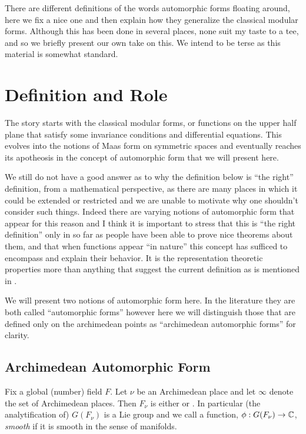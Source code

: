 There are different definitions of the words automorphic forms floating around, here we fix a nice one and then explain how they generalize the classical modular forms. Although this has been done in several places, none suit my taste to a tee, and so we briefly present our own take on this. We intend to be terse as this material is somewhat standard.

\section{Definition and Role}
The story starts with the classical modular forms, or functions on the upper half plane that satisfy some invariance conditions and differential equations. This evolves into the notions of Maas form on symmetric spaces and eventually reaches its apotheosis in the concept of automorphic form that we will present here. 

We still do not have a good answer as to why the definition below is ``the right'' definition, from a mathematical perspective, as there are many places in which it could be extended or restricted and we are unable to motivate why one shouldn't consider such things. Indeed there are varying notions of automorphic form that appear for this reason and I think it is important to stress that this is ``the right definition'' only in so far as people have been able to prove nice theorems about them, and that when functions appear ``in nature'' this concept has sufficed to encompass and explain their behavior. It is the representation theoretic properties more than anything that suggest the current definition as is mentioned in \cite[1.II.3]{borelAutomorphicFormsRepresentations1979}.

We will present two notions of automorphic form here. In the literature they are both called ``automorphic forms'' however here we will distinguish those that are defined only on the archimedean points as ``archimedean automorphic forms'' for clarity.

\subsection{Archimedean Automorphic Form}
Fix a global (number) field \(F\). Let \(\nu\) be an Archimedean place and let \(\infty\) denote the set of Archimedean places. Then \(F_\nu\) is either \R or \C. In particular (the analytification of) \(G(F_\nu)\) is a Lie group and we call a function, \(\phi: G(F_\nu) \to \C\), \textit{smooth}  if it is smooth in the sense of manifolds.


